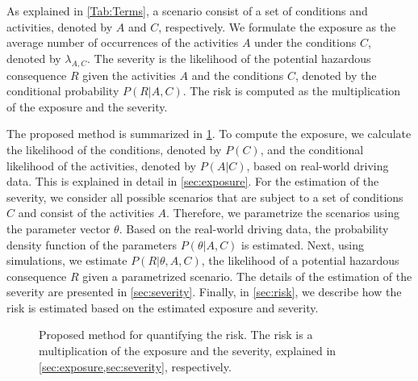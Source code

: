 As explained in \cref{Tab:Terms}, a scenario consist of a set of conditions and activities, denoted by $A$ and $C$, respectively. We formulate the exposure as the average number of occurrences of the activities $A$ under the conditions $C$, denoted by $\lambda_{A,C}$. The severity is the likelihood of the potential hazardous consequence $R$ given the activities $A$ and the conditions $C$, denoted by the conditional probability $P(R|A,C)$. The risk is computed as the multiplication of the exposure and the severity. 

The proposed method is summarized in \cref{fig:method}. To compute the exposure, we calculate the likelihood of the conditions, denoted by $P(C)$, and the conditional likelihood of the activities, denoted by $P(A|C)$, based on real-world driving data. This is explained in detail in \cref{sec:exposure}. For the estimation of the severity, we consider all possible scenarios that are subject to a set of conditions $C$ and consist of the activities $A$. Therefore, we parametrize the scenarios using the parameter vector $\theta$. Based on the real-world driving data, the probability density function of the parameters $P(\theta|A,C)$ is estimated. Next, using simulations, we estimate $P(R|\theta,A,C)$, the likelihood of a potential hazardous consequence $R$ given a parametrized scenario. The details of the estimation of the severity are presented in \cref{sec:severity}. Finally, in \cref{sec:risk}, we describe how the risk is estimated based on the estimated exposure and severity.

\begin{figure}
	\centering
	
	\caption{Proposed method for quantifying the risk. The risk is a multiplication of the exposure and the severity, explained in \cref{sec:exposure,sec:severity}, respectively.}
	\label{fig:method}
\end{figure}



